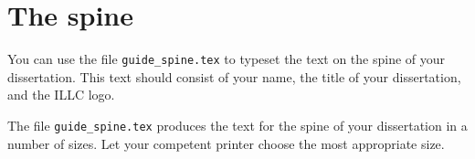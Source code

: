 \section{The spine}
You can use the file {\tt guide\_spine.tex} to
typeset the text on the spine of your dissertation. This
text should consist of your name, the title of your dissertation,
and the ILLC logo.

The file {\tt guide\_spine.tex} produces the text for the spine
of your dissertation in a number of sizes. Let your competent printer
choose the most appropriate size.





